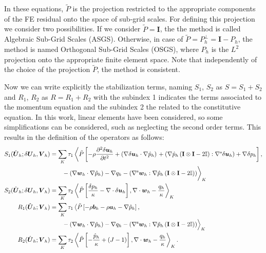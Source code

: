 \documentclass[11pt,english]{article}
\def\disp{\boldsymbol{u}}
\def\disptest{\boldsymbol{w}}
\def\Identity{\mathbf{I}}
\def\TestFunctions{\boldsymbol{V}}
\def\UnkVariables{\boldsymbol{U}}
\def\a{\boldsymbol{a}}
\begin{document}
   In these equations, $\tilde{P}$ is the projection restricted to the appropriate components of the FE residual onto the space of sub-grid scales. 
   For defining this projection we consider two possibilities. If we consider $\tilde{P}=\Identity$, the the method is called Algebraic Sub-Grid Scales (ASGS). Otherwise, in case of $\tilde{P}=P^{\bot}_h = \Identity-P_h$, the method is named Orthogonal Sub-Grid Scales (OSGS), where $P_h$ is the $L^2$ projection onto the appropriate finite element space.  Note that independently of the choice of the projection $\tilde{P}$, the method is consistent.  
   
   Now we can write explicitly the stabilization terms, naming $S_1$, $S_2$ as $S = S_1 + S_2$ and $R_1$, $R_2$  as $R = R_1 + R_2$ with the subindex 1 indicates the terms associated to the momentum equation and the subindex 2 the related to the constitutive equation. In this work, linear elements have been considered, so some simplifications can be considered, such as neglecting the second order terms. This results in the definition of the operators as follows:
    \begin{align*}
        S_1(\hat{\UnkVariables}_h;\delta \UnkVariables_h,\TestFunctions_h)&=
        \sum_K\tau_1\left\langle \tilde{P}\left[-\rho \dfrac{\partial^2 \delta \disp_h }{\partial t^2}+ \left(\nabla \delta \disp_h \cdot \nabla  \hat{p}_h \right)\right.+ \left(\nabla \hat{p}_h\left( \Identity \otimes \Identity -2\mathbb{I}\right):\nabla^{\rm{s}} \delta \disp_h \right) + \nabla \delta p_h \right],\nonumber\\
        & \qquad -\left(\nabla \disptest_h \cdot \nabla   \hat{p}_h \right)- \nabla q_h - \left(\nabla^{\rm{s}} \disptest_h: \nabla  \hat{p}_h\left( \Identity \otimes \Identity -2\mathbb{I}\right)\right) \biggr>_K\\
        S_2(\hat{\UnkVariables}_h;\delta \UnkVariables_h,\TestFunctions_h)&=\sum_K\tau_2\left\langle\tilde{P}\left[\dfrac{\delta p_h}{\kappa}- \nabla \cdot \delta \disp_h\right], \nabla \cdot \disptest_h - \dfrac{q_h}{\kappa}  \right\rangle_K\\
        R_1(\hat{\UnkVariables}_h;\TestFunctions_h)&=\sum_K\tau_1\left\langle \tilde{P}\left[-\rho\boldsymbol{b}_h- \rho\a_h-\nabla \hat{p}_h\right]
        ,\right. \nonumber\\
        & \qquad  -\left(\nabla \disptest_h \cdot \nabla  \hat{p}_h \right)- \nabla q_h - \left(\nabla^{\rm{s}} \disptest_h: \nabla \hat{p}_h\left( \Identity \otimes \Identity -2\mathbb{I}\right)\right) \Bigr>_K\\
        R_2(\hat{\UnkVariables}_h;\TestFunctions_h )&=\sum_K\tau_2\left\langle\tilde{P}\left[-\dfrac{\hat{p}_h}{\kappa}+(J-1) \right], \nabla \cdot \disptest_h - \dfrac{q_h}{\kappa}  \right\rangle_K.
    \end{align*}
\end{document}
